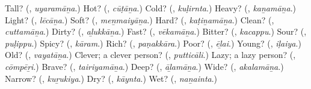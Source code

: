 \begin{tcolorbox}[breakable,colback=teal!4,colframe=teal!35!black,title={Before you move on}]
Tall? (\textbf{}, \emph{uyaramāṉa}.) Hot? (\textbf{}, \emph{cūṭāṉa}.) Cold? (\textbf{}, \emph{kuḷirnta}.) Heavy? (\textbf{}, \emph{kaṉamāṉa}.) Light? (\textbf{}, \emph{lēcāṉa}.) Soft? (\textbf{}, \emph{meṉmaiyāṉa}.) Hard? (\textbf{}, \emph{kaṭiṉamāṉa}.) Clean? (\textbf{}, \emph{cuttamāṉa}.) Dirty? (\textbf{}, \emph{aḻukkāṉa}.) Fast? (\textbf{}, \emph{vēkamāṉa}.) Bitter? (\textbf{}, \emph{kacappu}.) Sour? (\textbf{}, \emph{puḷippu}.) Spicy? (\textbf{}, \emph{kāram}.) Rich? (\textbf{}, \emph{paṇakkāra}.) Poor? (\textbf{}, \emph{ēḻai}.) Young? (\textbf{}, \emph{iḷaiya}.) Old? (\textbf{}, \emph{vayatāṉa}.) Clever; a clever person? (\textbf{}, \emph{putticāli}.) Lazy; a lazy person? (\textbf{}, \emph{cōmpēṟi}.) Brave? (\textbf{}, \emph{tairiyamāṉa}.) Deep? (\textbf{}, \emph{āḻamāṉa}.) Wide? (\textbf{}, \emph{akalamāṉa}.) Narrow? (\textbf{}, \emph{kuṟukiya}.) Dry? (\textbf{}, \emph{kāynta}.) Wet? (\textbf{}, \emph{naṉainta}.)
\end{tcolorbox}
